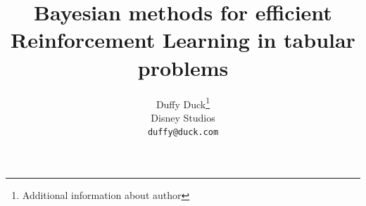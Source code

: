\documentclass{article}
\title{Bayesian methods for efficient\\Reinforcement Learning in tabular problems}
\author{%
  Duffy Duck\thanks{Additional information about author} \\
  Disney Studios\\
  \texttt{duffy@duck.com} \\
}
\begin{document}

\maketitle
\end{document}
